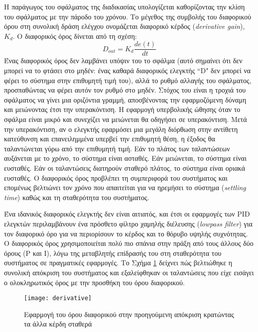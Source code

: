 Η παράγωγος του σφάλματος της διαδικασίας υπολογίζεται καθορίζοντας την κλίση του σφάλματος με την πάροδο του χρόνου. Το μέγεθος της συμβολής του διαφορικού όρου στη συνολική δράση ελέγχου ονομάζεται διαφορικό κέρδος (\emph{derivative gain}), $K_d$. Ο διαφορικός όρος δίνεται από τη σχέση:
\begin{equation}
D_{out}=K_d \frac{de(t)}{dt}
\label{eq:dout}
\end{equation}
Ένας διαφορικός όρος δεν λαμβάνει υπόψιν του το σφάλμα (αυτό σημαίνει ότι δεν μπορεί να το φτάσει στο μηδέν: ένας καθαρά διαφορικός ελεγκτής ``D" δεν μπορεί να φέρει το σύστημα στην επιθυμητή τιμή του), αλλά το ρυθμό αλλαγής του σφάλματος, προσπαθώντας να φέρει αυτόν τον ρυθμό στο μηδέν. Στόχος του είναι η τροχιά του σφάλματος να γίνει μια οριζόντια γραμμή, αποσβένοντας την εφαρμοζόμενη δύναμη και μειώνοντας έτσι την υπερακόντιση. Η εφαρμογή υπερβολικής ώθησης όταν το σφάλμα είναι μικρό και συνεχίζει να μειώνεται θα οδηγήσει σε υπερακόντιση. Μετά την υπερακόντιση, αν ο ελεγκτής εφαρμόσει μια μεγάλη διόρθωση στην αντίθετη κατεύθυνση και επανειλημμένα υπερβεί την επιθυμητή θέση, η έξοδος θα ταλαντώνεται γύρω από την επιθυμητή τιμή. Εάν το πλάτος των ταλαντώσεων αυξάνεται με το χρόνο, το σύστημα είναι ασταθές. Εάν μειώνεται, το σύστημα είναι ευσταθές. Εάν οι ταλαντώσεις διατηρούν σταθερό πλάτος, το σύστημα είναι οριακά ευσταθές. Ο διαφορικός όρος προβλέπει τη συμπεριφορά του συστήματος και επομένως βελτιώνει τον χρόνο που απαιτείται για να ηρεμήσει το σύστημα (\emph{settling time}) καθώς και τη σταθερότητα του συστήματος.

Ένα ιδανικός διαφορικός ελεγκτής δεν είναι αιτιατός, και έτσι οι εφαρμογές των PID ελεγκτών περιλαμβάνουν ένα πρόσθετο φίλτρο χαμηλής διέλευσης (\emph{lowpass filter}) για τον διαφορικό όρο για να περιορίσουν το κέρδος και το θόρυβο υψηλής συχνότητας. Ο διαφορικός όρος χρησιμοποιείται πολύ πιο σπάνια στην πράξη από τους άλλους δύο όρους (P και I), λόγω της μεταβλητής επίδρασής του στη σταθερότητα του συστήματος σε πραγματικές εφαρμογές. Το Σχήμα \ref{fig:derivative} δείχνει πώς βελτιώθηκε η συνολική απόκριση του συστήματος και εξαλείφθηκαν οι ταλαντώσεις που είχε εισάγει ο ολοκληρωτικός όρος με την προσθήκη του όρου διαφορικού.

\begin{figure}[h]
  \centering
  \texttt{[image: derivative]}
  \caption{Εφαρμογή του όρου διαφορικού στην προηγούμενη απόκριση κρατώντας τα άλλα κέρδη σταθερά}
  \label{fig:derivative}
\end{figure}

